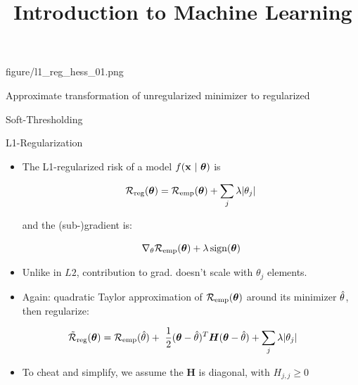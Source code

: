 \documentclass[11pt,compress,t,notes=noshow, xcolor=table]{beamer}
\title{Introduction to Machine Learning}
\begin{document}
{figure/l1_reg_hess_01.png}{
    \item Approximate transformation of unregularized minimizer to regularized 
    \item Soft-Thresholding
}

\begin{vbframe} {L1-Regularization}
  

  \begin{itemize}
    \item The L1-regularized risk of a model $f(\mathbf{x} ~|~ \bm{\theta})$ is

      \[
     \mathcal{R}_{\text{reg}}(\bm{\theta}) = \mathcal{R}_{\text{emp}}(\bm{\theta}) + \sum_j \lambda |\theta_j|
      \] 
      
      and the (sub-)gradient is:
      
      
      $$ \nabla_{\theta} \mathcal{R}_{\text{emp}}(\bm{\theta}) + \lambda \operatorname{sign}(\bm{\theta}) $$

    \item Unlike in $L2$, contribution to grad. doesn't scale with $\theta_j$ elements. 
    \item Again: quadratic Taylor approximation of $\mathcal{R}_{\text{emp}}(\bm{\theta})$ around its minimizer $\hat{\theta}$, then regularize:
  \end{itemize}

 $$\mathcal{\tilde R}_{\text{reg}}(\bm{\theta}) = \mathcal{R}_{\text{emp}}(\hat{\theta}) +\ \frac{1}{2} (\bm{\theta} - \hat{\theta})^T \bm{H} (\bm{\theta} - \hat{\theta})  + \sum_j \lambda |\theta_j|$$
  
  \framebreak
  
  \begin{itemize}

\item To cheat and simplify, we assume the $\bm{H}$ is diagonal, with $H_{j,j} \geq 0$
  

\end{itemize}
\end{vbframe}
\end{document}
